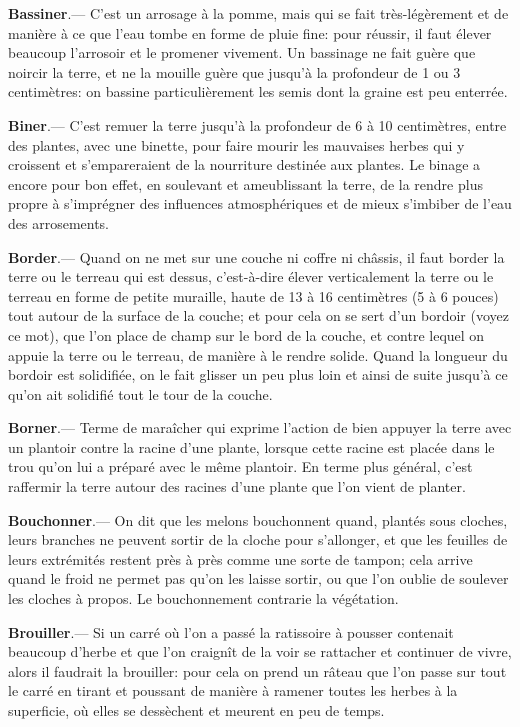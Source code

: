\documentclass[10pt,a4paper]{book}
\begin{document}
\textbf{Bassiner}.--- C'est un arrosage à la pomme, mais qui se fait très-légèrement et de manière à ce que l'eau tombe en forme de pluie fine: pour réussir, il faut élever beaucoup l'arrosoir et le promener vivement. Un bassinage ne fait guère que noircir la terre, et ne la mouille guère que jusqu'à la profondeur de 1 ou 3 centimètres: on bassine particulièrement les semis dont la graine est peu enterrée.

\textbf{Biner}.--- C'est remuer la terre jusqu'à la profondeur de 6 à 10 centimètres, entre des plantes, avec une binette, pour faire mourir les mauvaises herbes qui y croissent et s'empareraient de la nourriture destinée aux plantes. Le binage a encore pour bon effet, en soulevant et ameublissant la terre, de la rendre plus propre à s'imprégner des influences atmosphériques et de mieux s'imbiber de l'eau des arrosements.

\textbf{Border}.--- Quand on ne met sur une couche ni coffre ni châssis, il faut border la terre ou le terreau qui est dessus, c'est-à-dire élever verticalement la terre ou le terreau en forme de petite muraille, haute de 13 à 16 centimètres (5 à 6 pouces) tout autour de la surface de la couche; et pour cela on se sert d'un bordoir (voyez ce mot), que l'on place de champ sur le bord de la couche, et contre lequel on appuie la terre ou le terreau, de manière à le rendre solide. Quand la longueur du bordoir est solidifiée, on le fait glisser un peu plus loin et ainsi de suite jusqu'à ce qu'on ait solidifié tout le tour de la couche.

\textbf{Borner}.--- Terme de maraîcher qui exprime l'action de bien appuyer la terre avec un plantoir contre la racine d'une plante, lorsque cette racine est placée dans le trou qu'on lui a préparé avec le même plantoir. En terme plus général, c'est raffermir la terre autour des racines d'une plante que l'on vient de planter.

\textbf{Bouchonner}.--- On dit que les melons bouchonnent quand, plantés sous cloches, leurs branches ne peuvent sortir de la cloche pour s'allonger, et que les feuilles de leurs extrémités restent près à près comme une sorte de tampon; cela arrive quand le froid ne permet pas qu'on les laisse sortir, ou que l'on oublie de soulever les cloches à propos. Le bouchonnement contrarie la végétation.

\textbf{Brouiller}.--- Si un carré où l'on a passé la ratissoire à pousser contenait beaucoup d'herbe et que l'on craignît de la voir se rattacher et continuer de vivre, alors il faudrait la brouiller: pour cela on prend un râteau que l'on passe sur tout le carré en tirant et poussant de manière à ramener toutes les herbes à la superficie, où elles se dessèchent et meurent en peu de temps.
\end{document}
